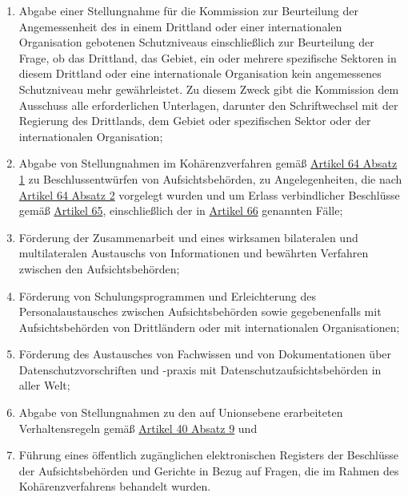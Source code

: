\begin{enumerate}
\begin{enumerate}
    \item Abgabe einer Stellungnahme für die Kommission zur Beurteilung der Angemessenheit des in einem Drittland oder
     einer internationalen Organisation gebotenen Schutzniveaus einschließlich zur Beurteilung der Frage, ob das
     Drittland, das Gebiet, ein oder mehrere spezifische Sektoren in diesem Drittland oder eine internationale
     Organisation kein angemessenes Schutzniveau mehr gewährleistet. Zu diesem Zweck gibt die Kommission dem Ausschuss
     alle erforderlichen Unterlagen, darunter den Schriftwechsel mit der Regierung des Drittlands, dem Gebiet oder
     spezifischen Sektor oder der internationalen Organisation;
    \label{itm:70-1s}

    \item Abgabe von Stellungnahmen im Kohärenzverfahren gemäß \hyperref[itm:64-1]{Artikel 64 Absatz 1} zu
     Beschlussentwürfen von Aufsichtsbehörden, zu Angelegenheiten, die nach \hyperref[itm:64-2]{Artikel 64 Absatz 2}
     vorgelegt wurden und um Erlass verbindlicher Beschlüsse gemäß \hyperref[ch:65]{Artikel 65}, einschließlich der
     in \hyperref[ch:66]{Artikel 66} genannten Fälle;
    \label{itm:70-1t}

    \item Förderung der Zusammenarbeit und eines wirksamen bilateralen und multilateralen Austauschs von Informationen
     und bewährten Verfahren zwischen den Aufsichtsbehörden;
    \label{itm:70-1u}

    \item Förderung von Schulungsprogrammen und Erleichterung des Personalaustausches zwischen Aufsichtsbehörden sowie
     gegebenenfalls mit Aufsichtsbehörden von Drittländern oder mit internationalen Organisationen;
    \label{itm:70-1v}

    \item Förderung des Austausches von Fachwissen und von Dokumentationen über Datenschutzvorschriften und -praxis mit
     Datenschutzaufsichtsbehörden in aller Welt;
    \label{itm:70-1w}

    \item Abgabe von Stellungnahmen zu den auf Unionsebene erarbeiteten Verhaltensregeln gemäß \hyperref[itm:40-9]
     {Artikel 40 Absatz 9} und
    \label{itm:70-1x}

    \item Führung eines öffentlich zugänglichen elektronischen Registers der Beschlüsse der Aufsichtsbehörden und
     Gerichte in Bezug auf Fragen, die im Rahmen des Kohärenzverfahrens behandelt wurden.
    \label{itm:70-1y}


\end{enumerate}
\end{enumerate}
